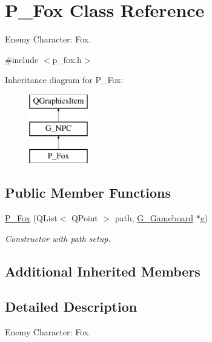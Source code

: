 \hypertarget{class_p___fox}{}\section{P\+\_\+\+Fox Class Reference}
\label{class_p___fox}


Enemy Character\+: Fox.  




{\ttfamily \#include $<$p\+\_\+fox.\+h$>$}

Inheritance diagram for P\+\_\+\+Fox\+:\begin{figure}[H]
\begin{center}
\leavevmode
\includegraphics[height=3.000000cm]{class_p___fox}
\end{center}
\end{figure}
\subsection*{Public Member Functions}
\begin{DoxyCompactItemize}
\item 
\hyperlink{class_p___fox_a6cab8923b0e5c4de67c1ac420965fbf5}{P\+\_\+\+Fox} (Q\+List$<$ Q\+Point $>$ path, \hyperlink{class_g___gameboard}{G\+\_\+\+Gameboard} $\ast$g)
\begin{DoxyCompactList}\small\item\em Constructor with path setup. \end{DoxyCompactList}\end{DoxyCompactItemize}
\subsection*{Additional Inherited Members}


\subsection{Detailed Description}
Enemy Character\+: Fox. 

